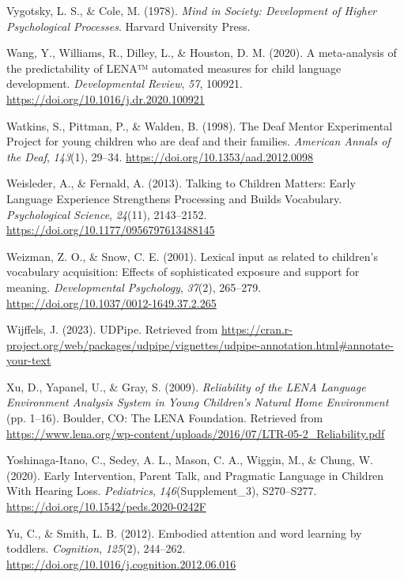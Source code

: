 \documentclass[
  man]{apa6}
\newlength{\cslhangindent}
\newlength{\cslentryspacingunit} %
\newenvironment{CSLReferences}[2] %
 {%
  \setlength{\parindent}{0pt}
  \ifodd #1
  \let\oldpar\par
  \def\par{\hangindent=\cslhangindent\oldpar}
  \fi
  \setlength{\parskip}{#2\cslentryspacingunit}
 }%
 {}
\begin{document}
\begin{CSLReferences}{1}{0}
\leavevmode{}%
Vygotsky, L. S., \& Cole, M. (1978). \emph{Mind in {Society}: {Development} of {Higher} {Psychological} {Processes}}. Harvard University Press.

\leavevmode{}%
Wang, Y., Williams, R., Dilley, L., \& Houston, D. M. (2020). A meta-analysis of the predictability of {LENA}™ automated measures for child language development. \emph{Developmental Review}, \emph{57}, 100921. \url{https://doi.org/10.1016/j.dr.2020.100921}

\leavevmode{}%
Watkins, S., Pittman, P., \& Walden, B. (1998). The {Deaf} {Mentor} {Experimental} {Project} for young children who are deaf and their families. \emph{American Annals of the Deaf}, \emph{143}(1), 29--34. \url{https://doi.org/10.1353/aad.2012.0098}

\leavevmode{}%
Weisleder, A., \& Fernald, A. (2013). Talking to {Children} {Matters}: {Early} {Language} {Experience} {Strengthens} {Processing} and {Builds} {Vocabulary}. \emph{Psychological Science}, \emph{24}(11), 2143--2152. \url{https://doi.org/10.1177/0956797613488145}

\leavevmode{}%
Weizman, Z. O., \& Snow, C. E. (2001). Lexical input as related to children's vocabulary acquisition: Effects of sophisticated exposure and support for meaning. \emph{Developmental Psychology}, \emph{37}(2), 265--279. \url{https://doi.org/10.1037/0012-1649.37.2.265}

\leavevmode{}%
Wijffels, J. (2023). {UDPipe}. Retrieved from \url{https://cran.r-project.org/web/packages/udpipe/vignettes/udpipe-annotation.html\#annotate-your-text}

\leavevmode{}%
Xu, D., Yapanel, U., \& Gray, S. (2009). \emph{Reliability of the {LENA} {Language} {Environment} {Analysis} {System} in {Young} {Children}'s {Natural} {Home} {Environment}} (pp. 1--16). Boulder, CO: The LENA Foundation. Retrieved from \url{https://www.lena.org/wp-content/uploads/2016/07/LTR-05-2_Reliability.pdf}

\leavevmode{}%
Yoshinaga-Itano, C., Sedey, A. L., Mason, C. A., Wiggin, M., \& Chung, W. (2020). Early {Intervention}, {Parent} {Talk}, and {Pragmatic} {Language} in {Children} {With} {Hearing} {Loss}. \emph{Pediatrics}, \emph{146}(Supplement\_3), S270--S277. \url{https://doi.org/10.1542/peds.2020-0242F}

\leavevmode{}%
Yu, C., \& Smith, L. B. (2012). Embodied attention and word learning by toddlers. \emph{Cognition}, \emph{125}(2), 244--262. \url{https://doi.org/10.1016/j.cognition.2012.06.016}

\end{CSLReferences}
\end{document}
